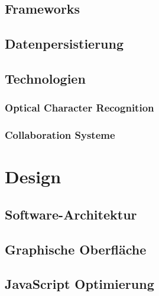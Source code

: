 \documentclass[12pt]{article}
\begin{document}
\subsection{Frameworks}
\label{subsec:frameworks}


\newpage

\subsection{Datenpersistierung}
\label{subsec:datenpersistierung}


\newpage

\subsection{Technologien}
\label{subsec:technologien}

\subsubsection{Optical Character Recognition}
\label{subsubsec:sota_ocr}

\newpage
\subsubsection{Collaboration Systeme}
\label{subsubsec:sota_pws}


\newpage %

\section{Design}
\label{sec:design}


\subsection{Software-Architektur}
\label{subsec:softwarearchitektur}


\newpage

\subsection{Graphische Oberfläche}
\label{subsec:graphischeoberflaeche}


\newpage

\subsection{JavaScript Optimierung}
\label{subsec:javascriptoptimierung}

\end{document}
